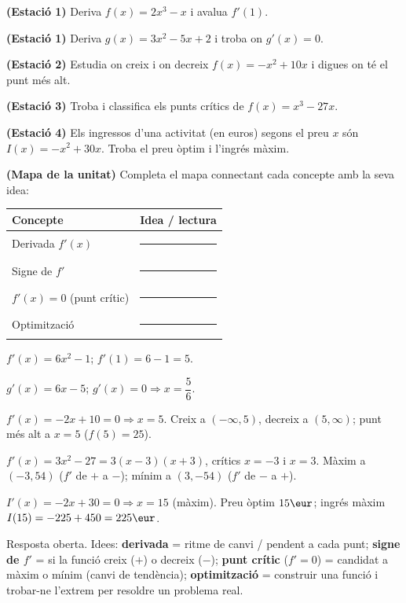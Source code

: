 \begin{exercicis}
\begin{exlist}
  \item \textbf{(Estació 1)} Deriva $f(x)=2x^3-x$ i avalua $f'(1)$.
  \item \textbf{(Estació 1)} Deriva $g(x)=3x^2-5x+2$ i troba on $g'(x)=0$.
  \item \textbf{(Estació 2)} Estudia on creix i on decreix $f(x)=-x^2+10x$ i digues on
        té el punt més alt.
  \item \textbf{(Estació 3)} Troba i classifica els punts crítics de $f(x)=x^3-27x$.
  \item \textbf{(Estació 4)} Els ingressos d'una activitat (en euros) segons el preu $x$
        són $I(x)=-x^2+30x$. Troba el preu òptim i l'ingrés màxim.
  \item \textbf{(Mapa de la unitat)} Completa el mapa connectant cada concepte amb la
        seva idea:
        \begin{center}
        \renewcommand{\arraystretch}{1.4}
        \begin{tabular}{p{3.8cm} p{8.6cm}}
        \toprule
        \textbf{Concepte} & \textbf{Idea / lectura} \\
        \midrule
        Derivada $f'(x)$ & \rule{7.8cm}{0.4pt} \\
        Signe de $f'$ & \rule{7.8cm}{0.4pt} \\
        $f'(x)=0$ (punt crític) & \rule{7.8cm}{0.4pt} \\
        Optimització & \rule{7.8cm}{0.4pt} \\
        \bottomrule
        \end{tabular}
        \end{center}
\end{exlist}
\end{exercicis}

\begin{solucions}
\begin{sollist}
  \item $f'(x)=6x^2-1$; $f'(1)=6-1=5$.
  \item $g'(x)=6x-5$; $g'(x)=0\Rightarrow x=\dfrac{5}{6}$.
  \item $f'(x)=-2x+10=0\Rightarrow x=5$. Creix a $(-\infty,5)$, decreix a $(5,\infty)$;
        punt més alt a $x=5$ ($f(5)=25$).
  \item $f'(x)=3x^2-27=3(x-3)(x+3)$, crítics $x=-3$ i $x=3$. Màxim a $(-3,54)$ ($f'$ de
        $+$ a $-$); mínim a $(3,-54)$ ($f'$ de $-$ a $+$).
  \item $I'(x)=-2x+30=0\Rightarrow x=15$ (màxim). Preu òptim $15\eur$; ingrés màxim
        $I(15)=-225+450=225\eur$.
  \item Resposta oberta. Idees: \textbf{derivada} = ritme de canvi / pendent a cada punt;
        \textbf{signe de $f'$} = si la funció creix ($+$) o decreix ($-$); \textbf{punt
        crític} ($f'=0$) = candidat a màxim o mínim (canvi de tendència);
        \textbf{optimització} = construir una funció i trobar-ne l'extrem per resoldre un
        problema real.
\end{sollist}
\end{solucions}
